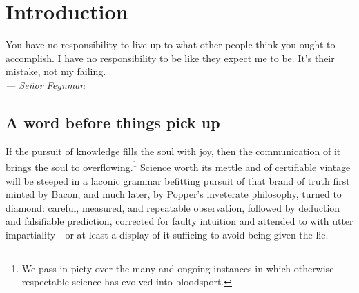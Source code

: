 
\chapter{Introduction}
\label{chp:1}

\begin{flushright}
  \begin{minipage}[]{0.5\linewidth}
    \begin{flushright}
      You have no responsibility to live up to what other people think you ought
      to accomplish. I have no responsibility to be like they expect me to
      be. It's their mistake, not my failing.  \\{\small \emph{--- Se\~{n}or
          Feynman} }
    \end{flushright}
  \end{minipage}
\end{flushright}
\vspace{\baselineskip}

\section{A word before things pick up}

If the pursuit of knowledge fills the soul with joy, then the
communication of it brings the soul to overflowing.\footnote{We pass
  in piety over the many and ongoing instances in which otherwise
  respectable science has evolved into bloodsport.} Science worth its
mettle and of certifiable vintage will be steeped in a laconic grammar
befitting pursuit of that brand of truth first minted by Bacon, and
much later, by Popper's inveterate philosophy, turned to diamond:
careful, measured, and repeatable observation, followed by deduction
and falsifiable prediction, corrected for faulty intuition and
attended to with utter impartiality---or at least a display of it
sufficing to avoid being given the lie.

